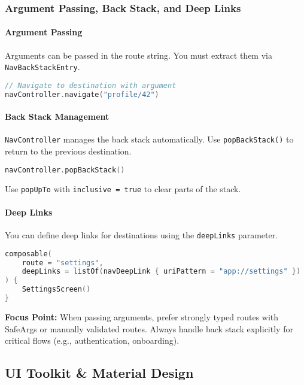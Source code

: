 \documentclass[a4paper,12pt]{article}
\begin{document}
\subsubsection{Argument Passing, Back Stack, and Deep Links}

\paragraph{Argument Passing}
Arguments can be passed in the route string. You must extract them via \texttt{NavBackStackEntry}.

\begin{lstlisting}[language=Kotlin]
// Navigate to destination with argument
navController.navigate("profile/42")
\end{lstlisting}

\paragraph{Back Stack Management}
\texttt{NavController} manages the back stack automatically. Use \texttt{popBackStack()} to return to the previous destination.

\begin{lstlisting}[language=Kotlin]
navController.popBackStack()
\end{lstlisting}

Use \texttt{popUpTo} with \texttt{inclusive = true} to clear parts of the stack.

\paragraph{Deep Links}
You can define deep links for destinations using the \texttt{deepLinks} parameter.

\begin{lstlisting}[language=Kotlin]
composable(
    route = "settings",
    deepLinks = listOf(navDeepLink { uriPattern = "app://settings" })
) {
    SettingsScreen()
}
\end{lstlisting}

\textbf{Focus Point:} When passing arguments, prefer strongly typed routes with SafeArgs or manually validated routes. Always handle back stack explicitly for critical flows (e.g., authentication, onboarding).

\subsection{UI Toolkit \& Material Design}
\end{document}
